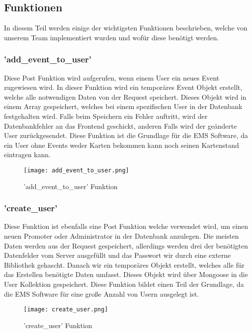 \subsection{Funktionen}
In diesem Teil werden einige der wichtigsten Funktionen beschrieben, welche von unserem Team implementiert wurden und wofür diese benötigt werden. 		 	
\subsubsection{'add\_event\_to\_user'}
Diese Post Funktion wird aufgerufen, wenn einem User ein neues Event zugewiesen wird. 
In dieser Funktion wird ein temporäres Event Objekt erstellt, welche alle notwendigen Daten von der Request speichert. 
Dieses Objekt wird in einem Array gespeichert, welches bei einem spezifischen User in der Datenbank festgehalten wird. 
Falls beim Speichern ein Fehler auftritt, wird der Datenbankfehler an das Frontend geschickt, anderen Falls wird der geänderte User zurückgesendet. 
Diese Funktion ist die Grundlage für die EMS Software, da ein User ohne Events weder Karten bekommen kann noch seinen Kartenstand eintragen kann.		 		
\begin{figure}[H]
	\centering
	\texttt{[image: add\_event\_to\_user.png]}
	\caption{'add\_event\_to\_user' Funktion}
\end{figure}	 	
\newpage
\subsubsection{'create\_user'}
Diese Funktion ist ebenfalls eine Post Funktion welche verwendet wird, um einen neuen Promoter oder Administrator in der Datenbank anzulegen. 
Die meisten Daten werden aus der Request gespeichert, allerdings werden drei der benötigten Datenfelder vom Server ausgefüllt und das Passwort wir durch eine externe Bibliothek gehascht. 
Danach wir ein temporäres Objekt erstellt, welches alle für das Erstellen benötigte Daten umfasst. 
Dieses Objekt wird über Mongoose in die User Kollektion gespeichert. Diese Funktion bildet einen Teil der Grundlage, da die EMS Software für eine große Anzahl von Usern ausgelegt ist. 		 		
\begin{figure}[H]
	\centering
	\texttt{[image: create\_user.png]}
	\caption{'create\_user' Funktion}
\end{figure}		 	
\newpage	
